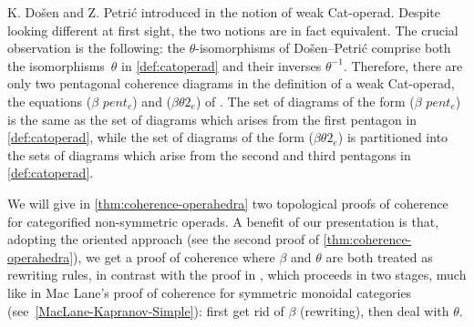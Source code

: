 \begin{rem}
\label{rem:DPLA}
K. Do{\v s}en and Z. Petri{\'c} introduced in \cite[Sec.~12]{DP15} the notion of weak Cat-operad.
Despite looking different at first sight, the two notions are in fact equivalent.
The crucial observation is the following: the $\theta$-isomorphisms of Do{\v s}en--Petri{\'c} comprise both the isomorphisms~$\theta$ in \cref{def:catoperad} and their inverses $\theta^{-1}$.
Therefore, there are only two pentagonal coherence diagrams in the definition of a weak Cat-operad, the equations ($\beta$ $pent_e$) and ($\beta\theta 2_e$) of \cite[Section 9]{DP15}.
The set of diagrams of the form ($\beta$ $pent_e$) is the same as the set of diagrams which arises from the first pentagon in \cref{def:catoperad}, while the set of diagrams of the form ($\beta\theta 2_e$) is partitioned into the sets of diagrams which arise from the second and third pentagons in \cref{def:catoperad}.

We will give in \cref{thm:coherence-operahedra} two topological proofs of coherence for categorified non-symmetric operads.
A benefit of our presentation is that, adopting the oriented approach (see the second proof of \cref{thm:coherence-operahedra}), we get a proof of coherence where $\beta$ and $\theta$ are both treated as rewriting rules, in contrast with the proof in \cite{DP15}, which proceeds in two stages, much like in Mac Lane's proof of coherence for symmetric monoidal categories (see~\cref{MacLane-Kapranov-Simple}): first get rid of $\beta$ (rewriting), then deal with $\theta$. 
\end{rem}

